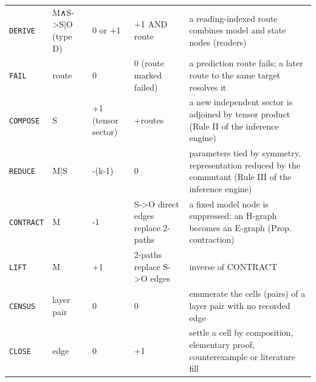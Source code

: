 \begin{longtable}{@{}p{1.7cm}p{2.2cm}p{2.3cm}p{3.0cm}p{5.4cm}@{}}
\texttt{DERIVE} & M∧S->S|O (type D) & 0 or +1 & +1 AND route & a reading-indexed route combines model and state nodes (readers) \\
\texttt{FAIL} & route & 0 & 0 (route marked failed) & a prediction route fails; a later route to the same target resolves it \\
\texttt{COMPOSE} & S & +1 (tensor sector) & +routes & a new independent sector is adjoined by tensor product (Rule II of the inference engine) \\
\texttt{REDUCE} & M|S & -(k-1) & 0 & parameters tied by symmetry, representation reduced by the commutant (Rule III of the inference engine) \\
\texttt{CONTRACT} & M & -1 & S->O direct edges replace 2-paths & a fixed model node is suppressed: an H-graph becomes an E-graph (Prop. contraction) \\
\texttt{LIFT} & M & +1 & 2-paths replace S->O edges & inverse of CONTRACT \\
\texttt{CENSUS} & layer pair & 0 & 0 & enumerate the cells (pairs) of a layer pair with no recorded edge \\
\texttt{CLOSE} & edge & 0 & +1 & settle a cell by composition, elementary proof, counterexample or literature fill \\
\bottomrule\end{longtable}
